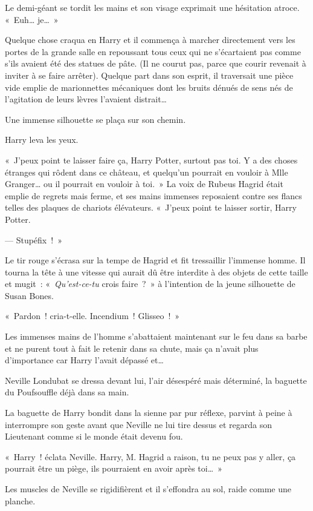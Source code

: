Le demi-géant se tordit les mains et son visage exprimait une hésitation atroce.
«~Euh… je…~»

Quelque chose craqua en Harry et il commença à marcher directement vers les portes de la grande salle en repoussant tous ceux qui ne s'écartaient pas comme s'ils avaient été des statues de pâte.
(Il ne courut pas, parce que courir revenait à inviter à se faire arrêter).
Quelque part dans son esprit, il traversait une pièce vide emplie de marionnettes mécaniques dont les bruits dénués de sens nés de l'agitation de leurs lèvres l'avaient distrait…

Une immense silhouette se plaça sur son chemin.

Harry leva les yeux.

«~J'peux point te laisser faire ça, Harry Potter, surtout pas toi.
Y a des choses étranges qui rôdent dans ce château, et quelqu'un pourrait en vouloir à Mlle Granger… ou il pourrait en vouloir à toi.~»
La voix de Rubeus Hagrid était emplie de regrets mais ferme, et ses mains immenses reposaient contre ses flancs telles des plaques de chariots élévateurs.
«~J'peux point te laisser sortir, Harry Potter.

--- Stupéfix~!~»

Le tir rouge s'écrasa sur la tempe de Hagrid et fit tressaillir l'immense homme.
Il tourna la tête à une vitesse qui aurait dû être interdite à des objets de cette taille et mugit~: «~\emph{Qu'est-ce-tu} crois faire~?~»
à l'intention de la jeune silhouette de Susan Bones.

«~Pardon~! cria-t-elle.
Incendium~!
Glisseo~!~»

Les immenses mains de l'homme s'abattaient maintenant sur le feu dans sa barbe et ne purent tout à fait le retenir dans sa chute, mais ça n'avait plus d'importance car Harry l'avait dépassé et…

Neville Londubat se dressa devant lui, l'air désespéré mais déterminé, la baguette du Poufsouffle déjà dans sa main.

La baguette de Harry bondit dans la sienne par pur réflexe, parvint à peine à interrompre son geste avant que Neville ne lui tire dessus et regarda son Lieutenant comme si le monde était devenu fou.

«~Harry~! éclata Neville.
Harry, M. Hagrid a raison, tu ne peux pas y aller, ça pourrait être un piège, ils pourraient en avoir après toi…~»

Les muscles de Neville se rigidifièrent et il s'effondra au sol, raide comme une planche.

